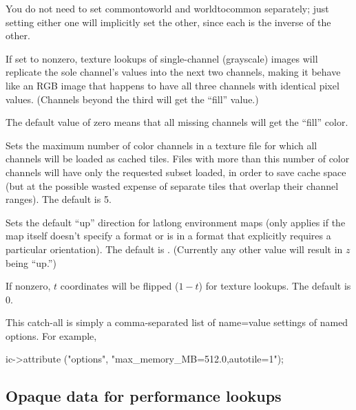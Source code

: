 You do not need to set {\cf commontoworld} and {\cf worldtocommon}
separately; just setting either one will implicitly set the other, since
each is the inverse of the other.
\apiend

If set to nonzero, texture lookups of single-channel (grayscale) 
images will replicate the sole channel's values into the next two
channels, making it behave like an RGB image that happens to have all
three channels with identical pixel values.  (Channels beyond the third
will get the ``fill'' value.)

The default value of zero means that all missing channels will get
the ``fill'' color.
\apiend

Sets the maximum number of color channels in a texture file for which all
channels will be loaded as cached tiles. Files with more than this number
of color channels will have only the requested subset loaded, in order
to save cache space (but at the possible wasted expense of separate tiles
that overlap their channel ranges). The default is 5.
\apiend

Sets the default ``up'' direction for latlong environment maps (only
applies if the map itself doesn't specify a format or is in a format
that explicitly requires a particular orientation).  The default is
.  (Currently any other value will result in $z$ being ``up.'')
\apiend

If nonzero, $t$ coordinates will be flipped ($1-t$) for texture lookups.
The default is 0.
\apiend

This catch-all is simply a comma-separated list of {\cf name=value}
settings of named options.  For example,
\begin{code}
        ic->attribute ("options", "max_memory_MB=512.0,autotile=1");
\end{code}
\apiend



\subsection{Opaque data for performance lookups}
\label{sec:texturesys:api:opaque}

 

